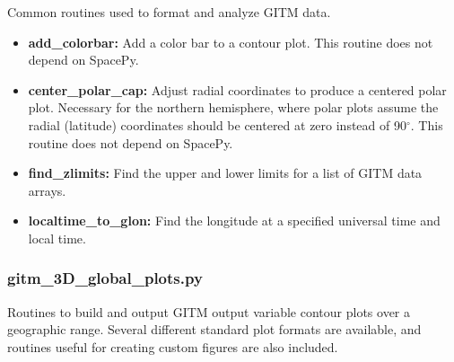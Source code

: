 Common routines used to format and analyze GITM data.

\begin{itemize}
\item[]{{\bf add\_colorbar:}  Add a color bar to a contour plot.  This routine does not depend on SpacePy.}
\item[]{{\bf center\_polar\_cap:}  Adjust radial coordinates to produce a centered polar plot.  Necessary for the northern hemisphere, where polar plots assume the radial (latitude) coordinates should be centered at zero instead of 90$^\circ$.  This routine does not depend on SpacePy.}
\item[]{{\bf find\_zlimits:}  Find the upper and lower limits for a list of GITM data arrays.}
\item[]{{\bf localtime\_to\_glon:}  Find the longitude at a specified universal time and local time.}
\end{itemize}

\subsubsection{gitm\_3D\_global\_plots.py}

Routines to build and output GITM output variable contour plots over a geographic range.  Several different standard plot formats are available, and routines useful for creating custom figures are also included.

